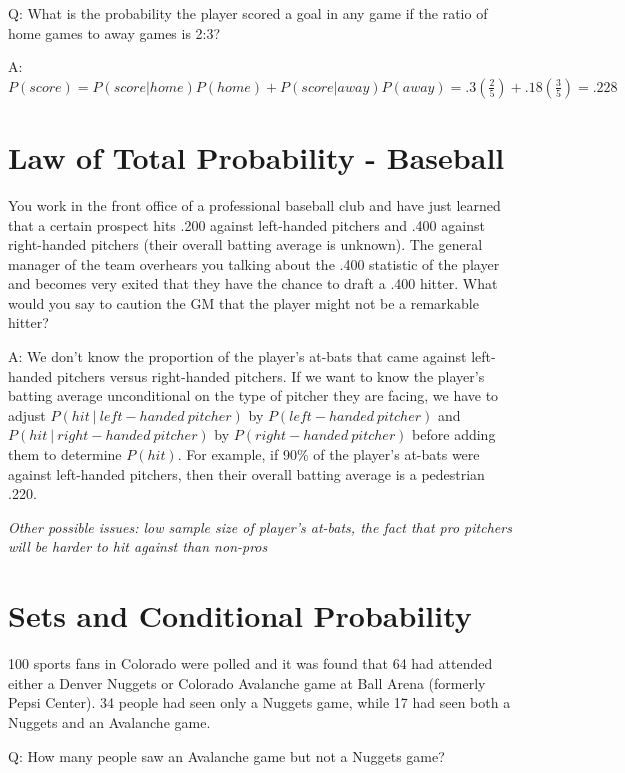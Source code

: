 \documentclass[
  11pt,
]{book}
\theoremstyle{definition}
\theoremstyle{definition}
\theoremstyle{definition}
\theoremstyle{definition}
\theoremstyle{remark}
\begin{document}
Q: What is the probability the player scored a goal in any game if the ratio of home games to away games is 2:3?

A: \(P(score) = P(score|home)P(home) + P(score|away)P(away) = .3(\frac{2}{5}) + .18(\frac{3}{5}) = .228\)

\hypertarget{law-of-total-probability---baseball}{%
\section{Law of Total Probability - Baseball}\label{law-of-total-probability---baseball}}

You work in the front office of a professional baseball club and have just learned that a certain prospect hits .200 against left-handed pitchers and .400 against right-handed pitchers (their overall batting average is unknown). The general manager of the team overhears you talking about the .400 statistic of the player and becomes very exited that they have the chance to draft a .400 hitter. What would you say to caution the GM that the player might not be a remarkable hitter?

A: We don't know the proportion of the player's at-bats that came against left-handed pitchers versus right-handed pitchers. If we want to know the player's batting average unconditional on the type of pitcher they are facing, we have to adjust \(P(hit\ |\ left-handed\ pitcher)\) by \(P(left-handed\ pitcher)\) and \(P(hit\ |\ right-handed\ pitcher)\) by \(P(right-handed\ pitcher)\) before adding them to determine \(P(hit)\). For example, if 90\% of the player's at-bats were against left-handed pitchers, then their overall batting average is a pedestrian .220.

\emph{Other possible issues: low sample size of player's at-bats, the fact that pro pitchers will be harder to hit against than non-pros}

\hypertarget{sets-and-conditional-probability-1}{%
\section{Sets and Conditional Probability}\label{sets-and-conditional-probability-1}}

100 sports fans in Colorado were polled and it was found that 64 had attended either a Denver Nuggets or Colorado Avalanche game at Ball Arena (formerly Pepsi Center). 34 people had seen only a Nuggets game, while 17 had seen both a Nuggets and an Avalanche game.

Q: How many people saw an Avalanche game but not a Nuggets game?
\end{document}
